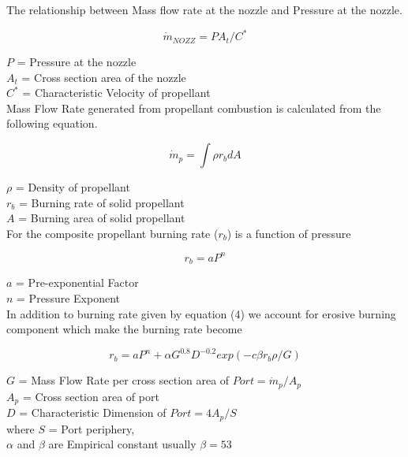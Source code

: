 \documentclass[conference]{IEEEtran}
\begin{document}
The relationship between Mass flow rate at the nozzle and Pressure at the nozzle.
\begin{center}
\begin{equation}
\dot{m}_{NOZZ} = P{A}_t/C^{*}
\end{equation}
\end{center}
$P$ = Pressure at the nozzle\\
${A}_t$ = Cross section area of the nozzle\\		
$C^{*}$ = Characteristic Velocity of propellant\\

Mass Flow Rate generated from propellant combustion is calculated from the following equation. 
\begin{center}
\begin{equation}
\dot{m}_{p} = \int\rho{r}_bdA
\end{equation}
\end{center}
$\rho$ = Density of propellant\\
${r}_b$ = Burning rate of solid propellant\\		
$A$ = Burning area of solid propellant\\

For the composite propellant burning rate (${r}_b$) is a function of pressure  
\begin{center}
\begin{equation}
{r}_b = aP^{n}
\end{equation}
\end{center}
$a$ = Pre-exponential Factor\\ 
$n$ = Pressure Exponent \\		

In addition to burning rate given by equation (4) we account for erosive burning component which make the burning rate become 
\begin{center}
\begin{equation}
{r}_b = aP^{n} + \alpha G^{0.8}D^{-0.2}exp(-c\beta{r}_b\rho/G)
\end{equation}
\end{center}
$G$ = Mass Flow Rate per cross section area of $Port = \dot{m}_{p}/{A}_p$\\
${A}_p$ = Cross section area of port\\		
$D$ = Characteristic Dimension of $Port = 4{A}_p/S$ \\
where $S$ = Port periphery, \\
$\alpha$ and $\beta$ are Empirical constant usually $\beta = 53$
\end{document}
